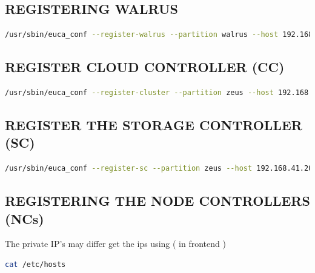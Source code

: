 \subsection{REGISTERING WALRUS}
\begin{lstlisting}[language=bash]
/usr/sbin/euca_conf --register-walrus --partition walrus --host 192.168.41.203 --component zeus-walrus 
\end{lstlisting}
\subsection{REGISTER CLOUD CONTROLLER (CC)}
\begin{lstlisting}[language=bash]
/usr/sbin/euca_conf --register-cluster --partition zeus --host 192.168.41.203 --component zeus-cc
\end{lstlisting}
\subsection{REGISTER THE STORAGE CONTROLLER (SC)}
\begin{lstlisting}[language=bash]
/usr/sbin/euca_conf --register-sc --partition zeus --host 192.168.41.203 --component zeus-sc
\end{lstlisting}

\subsection{REGISTERING THE NODE CONTROLLERS (NCs)}
The private IP’s may differ get the ips using ( in frontend )
\begin{lstlisting}[language=bash]
cat /etc/hosts
\end{lstlisting}

